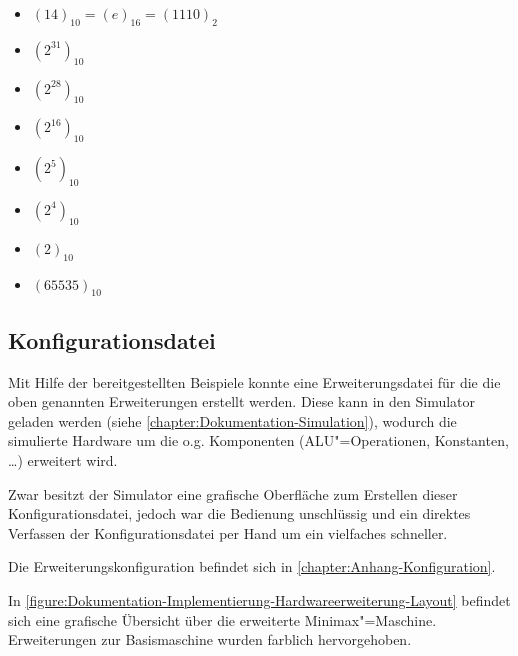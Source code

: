 \begin{itemize}
    \item $(14)_{10} = (e)_{16} = (1110)_2$
    \item $(2^{31})_{10}$
    \item $(2^{28})_{10}$
    \item $(2^{16})_{10}$
    \item $(2^5)_{10}$
    \item $(2^4)_{10}$
    \item $(2)_{10}$
    \item $(65535)_{10}$
\end{itemize}

\subsection{Konfigurationsdatei}
\label{subsection:Dokumentation-Implementierung-Hardwareerweiterung-Konfigurationsdatei}

Mit Hilfe der bereitgestellten Beispiele konnte eine Erweiterungsdatei für die die oben genannten Erweiterungen erstellt werden. Diese kann in den Simulator geladen werden (siehe \autoref{chapter:Dokumentation-Simulation}), wodurch die simulierte Hardware um die o.g. Komponenten (ALU"=Operationen, Konstanten, \ldots) erweitert wird.

Zwar besitzt der Simulator eine grafische Oberfläche zum Erstellen dieser Kon\-fi\-gu\-ra\-tions\-datei, jedoch war die Bedienung unschlüssig und ein direktes Verfassen der Konfigurationsdatei per Hand um ein vielfaches schneller.

Die Erweiterungskonfiguration befindet sich in \autoref{chapter:Anhang-Konfiguration}.

In \autoref{figure:Dokumentation-Implementierung-Hardwareerweiterung-Layout} befindet sich eine grafische Übersicht über die erweiterte Minimax"=Maschine. Erweiterungen zur Basismaschine wurden farblich hervorgehoben.


